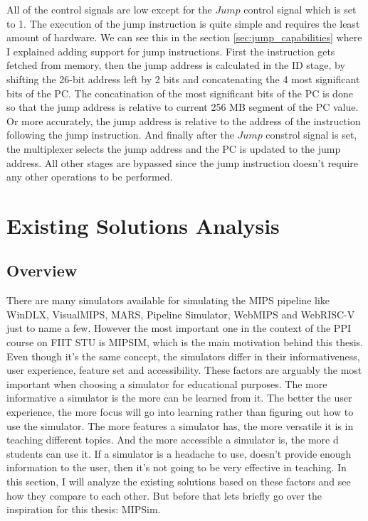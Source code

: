 All of the control signals are low except for the $Jump$ control signal which is set to 1. The execution of the jump instruction is quite simple and requires the least amount of hardware. We can see this in the section \ref{sec:jump_capabilities} where I explained adding support for jump instructions. First the instruction gets fetched from memory, then the jump address is calculated in the ID stage, by shifting the 26-bit address left by 2 bits and concatenating the 4 most significant bits of the PC. The concatination of the most significant bits of the PC is done so that the jump address is relative to current 256 MB segment of the PC value. Or more accurately, the jump address is relative to the address of the instruction following the jump instruction. And finally after the $Jump$ constrol signal is set, the multiplexer selects the jump address and the PC is updated to the jump address. All other stages are bypassed since the jump instruction doesn't require any other operations to be performed.




\section {Existing Solutions Analysis}

\subsection {Overview}\label{sec:existing_solutions_overview}
There are many simulators available for simulating the MIPS pipeline like WinDLX\cite{grunbacher1996windlx}, VisualMIPS\cite{visualmips}, MARS\cite{mars}, Pipeline Simulator\cite{pipelinesimulator}, WebMIPS and WebRISC-V\cite{Mariotti22-softwarex} just to name a few. However the most important one in the context of the PPI course on FIIT STU is MIPSIM\cite{grunbacher1996windlx}, which is the main motivation behind this thesis. 
Even though it's the same concept, the simulators differ in their informativeness, user experience, feature set and accessibility. These factors are arguably the most important when choosing a simulator for educational purposes. The more informative a simulator is the more can be learned from it. The better the user experience, the more focus will go into learning rather than figuring out how to use the simulator. The more features a simulator has, the more versatile it is in teaching different topics. And the more accessible a simulator is, the more d students can use it.
If a simulator is a headache to use, doesn't provide enough information to the user, then it's not going to be very effective in teaching. In this section, I will analyze the existing solutions based on these factors and see how they compare to each other.
But before that lets briefly go over the inspiration for this thesis: MIPSim.

